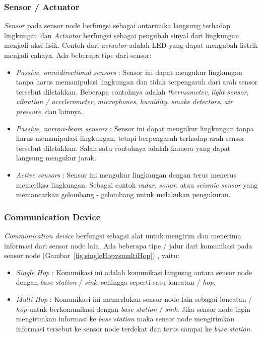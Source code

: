 \subsubsection{Sensor / Actuator}
{\it Sensor} pada sensor node berfungsi sebagai antarmuka langsung terhadap lingkungan dan {\it Actuator} berfungsi sebagai pengubah sinyal dari lingkungan menjadi aksi fisik. Contoh dari {\it actuator} adalah LED yang dapat mengubah listrik menjadi cahaya. Ada beberapa tipe dari sensor:
\begin{itemize}
	\item {\it Passive, omnidirectional sensors} : Sensor ini dapat mengukur lingkungan tanpa harus memanipulasi lingkungan dan tidak terpengaruh dari arah sensor tersebut diletakkan. Beberapa contohnya adalah {\it thermometer}, {\it light sensor}, {\it vibration / accelerometer}, {\it microphones}, {\it humidity}, {\it smoke detectors}, {\it air pressure}, dan lainnya.
	\item {\it Passive, narrow-beam sensors} : Sensor ini  dapat mengukur lingkungan tanpa harus memanipulasi lingkungan, tetapi berpengaruh terhadap arah sensor tersebut diletakkan. Salah satu contohnya adalah kamera yang dapat langsung mengukur jarak.
	\item {\it Active sensors} : Sensor ini mengukur lingkungan dengan terus menerus memeriksa lingkungan. Sebagai contoh {\it radar}, {\it sonar}, atau {\it seismic sensor} yang memancarkan gelombang - gelombang untuk melakukan pengukuran.
\end{itemize}

\subsubsection{Communication Device}
{\it Communication device} berfungsi sebagai alat untuk mengirim dan menerima informasi dari sensor node lain. Ada beberapa tipe / jalur dari komunikasi pada sensor node (Gambar~\ref{fig:singleHopvsmultiHop}) , yaitu:
\begin{itemize}
	\item {\it Single Hop} : Komunikasi ini adalah komunikasi langusng antara sensor node dengan {\it base station} / {\it sink}, sehingga seperti satu loncatan / {\it hop}.
	\item {\it Multi Hop} : Komunikasi ini memerlukan sensor node lain sebagai loncatan / {\it hop} untuk berkomunikasi dengan {\it base station} / {\it sink}. Jika sensor node ingin mengirimkan informasi ke {\it base station} maka sensor node mengirimkan informasi tersebut ke sensor node terdekat dan terus sampai ke {\it base station}.
\end{itemize}

